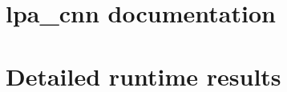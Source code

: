 \documentclass[12pt]{report}
\begin{document}
\newpage
{}
\listoffigures

\newpage
{}
\listofmyequations

\clearpage

\setcounter{page}{1}

\begin{spacing}{1.15}
	
	
	
		
	
\end{spacing}
\newpage
\thispagestyle{empty}
\null

\begin{appendices}
\chapter{lpa\_cnn documentation}

\chapter{Detailed runtime results}
%
\end{appendices}


\end{document}
